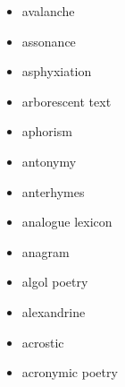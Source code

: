 \begin{multicols}{3}
\begin{itemize}
  \item avalanche
  \item assonance
  \item asphyxiation
  \item arborescent text
  \item aphorism
  \item antonymy
  \item anterhymes
  \item analogue lexicon
  \item anagram
  \item algol poetry
  \item alexandrine
  \item acrostic
  \item acronymic poetry
\end{itemize}
\end{multicols}
